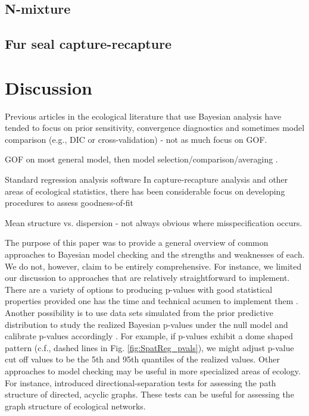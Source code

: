 \documentclass[12pt,english]{article}
\begin{document}
\begin{spacing}{1.9}
\subsection{N-mixture}

\subsection{Fur seal capture-recapture}

\section{Discussion}


Previous articles in the ecological literature that use Bayesian analysis have tended to focus on prior sensitivity, convergence diagnostics and sometimes model comparison (e.g., DIC or cross-validation) - not as much focus on GOF.

GOF on most general model, then model selection/comparison/averaging \citep{BurnhamAnderson2002}.

Standard regression analysis software In capture-recapture analysis and other areas of ecological statistics, there has been considerable focus on developing procedures to assess goodness-of-fit \citep[e.g.,][]{ChoquetEtAl2009}

Mean structure vs. dispersion - not always obvious where misspecification occurs.

The purpose of this paper was to provide a general overview of common approaches to Bayesian model checking and the strengths and weaknesses of each.  We do not, however, claim to be entirely comprehensive. For instance, we limited our discussion to approaches that are relatively straightforward to implement.  There are a variety of options to producing p-values with good statistical properties provided one has the time and technical acumen to implement them \citep[e.g., ``partial posterior" and ``conditional predictive" p-values; see][]{BayarriBerger1999,RobinsEtAl2000,BayarriCastellanos2007}. Another possibility is to use data sets simulated from the prior predictive distribution to study the realized Bayesian p-values under the null model  and calibrate p-values accordingly \citep{HjortEtAl2006}.  For example, if p-values exhibit a dome shaped pattern (c.f., dashed lines in Fig. \ref{fig:SpatReg_pvals}), we might adjust p-value cut off values to be the 5th and 95th quantiles of the realized values.
Other approaches to model checking may be useful in more specialized areas of ecology.
For instance, \citet{Shipley2009} introduced directional-separation tests for assessing the path structure of directed, acyclic graphs.  These tests can be useful for assessing the graph structure of ecological networks.



\end{spacing}
\end{document}
